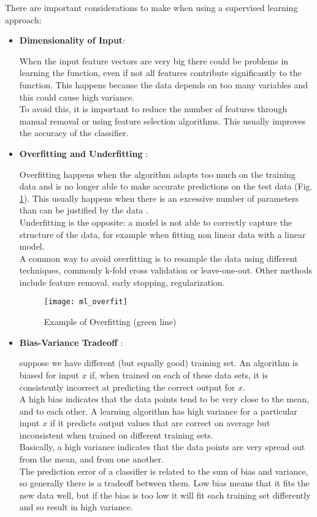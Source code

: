 There are important considerations to make when using a supervised learning approach:
\begin{itemize}
	\item \textbf{Dimensionality of Input}: 
	
	When the input feature vectors are very big there could be problems in learning the function, even if not all features contribute significantly to the function. This happens because the data depends on too many variables and this could cause high variance. \\
	To avoid this, it is important to reduce the number of features through manual removal or using feature selection algorithms. This usually improves the accuracy of the classifier.
	\item \textbf{Overfitting and Underfitting} \cite{overfit}: 
	
	Overfitting happens when the algorithm adapts too much on the training data and is no longer able to make accurate predictions on the test data (Fig. \ref{fig:ml_overfit}). This usually happens when there is an excessive number of parameters than can be justified by the data \cite{camb_over}. \\
	Underfitting is the opposite: a model is not able to correctly capture the structure of the data, for example when fitting non linear data with a linear model. \\
	A common way to avoid overfitting is to resample the data using different techniques, commonly k-fold cross validation or leave-one-out. Other methods include feature removal, early stopping, regularization.
	
	\begin{figure}[H]
		\centering
		\texttt{[image: ml\_overfit]}
		\caption{Example of Overfitting (green line) \cite{wiki:ml_overfit}}
		\label{fig:ml_overfit}
	\end{figure}	
	
	\item \textbf{Bias-Variance Tradeoff} \cite{biasvar}: 
	
	suppose we have different (but equally good) training set. An algorithm is biased for input $x$ if, when trained on each of these data sets, it is consistently incorrect at predicting the correct output for $x$. \\
	A high bias indicates that the data points tend to be very close to the mean, and to each other.
	A learning algorithm has high variance for a particular input $x$ if it predicts output values that are correct on average but inconsistent when trained on different training sets. \\
	Basically, a high variance indicates that the data points are very spread out from the mean, and from one another.\\
	The prediction error of a classifier is related to the sum of bias and variance, so generally there is a tradeoff between them. Low bias means that it fits the new data well, but if the bias is too low it will fit each training set differently and so result in high variance.
	

\end{itemize}
